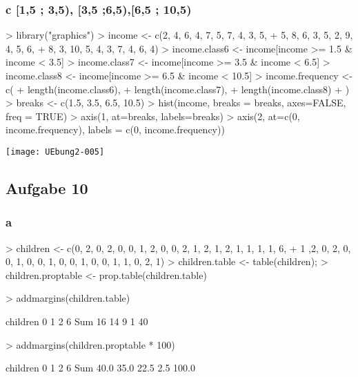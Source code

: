 \documentclass{article}
\begin{document}
\subsubsection{c [1,5 ; 3,5), [3,5 ;6,5),[6,5 ; 10,5)}

\begin{Schunk}
\begin{Sinput}
> library("graphics")
> income <- c(2, 4, 6, 4, 7, 5, 7, 4, 3, 5,
+             5, 8, 6, 3, 5, 2, 9, 4, 5, 6, 
+             8, 3, 10, 5, 4, 3, 7, 4, 6, 4)
> income.class6 <- income[income >= 1.5 & income < 3.5]
> income.class7 <- income[income >= 3.5 & income < 6.5]
> income.class8 <- income[income >= 6.5 & income < 10.5]
> income.frequency <- c(
+   length(income.class6),
+   length(income.class7),
+   length(income.class8)
+ )
> breaks <- c(1.5, 3.5, 6.5, 10.5)
> hist(income, breaks = breaks, axes=FALSE, freq = TRUE)
> axis(1, at=breaks, labels=breaks)
> axis(2, at=c(0, income.frequency), labels = c(0, income.frequency))
\end{Sinput}
\end{Schunk}
\texttt{[image: UEbung2-005]}

\subsection{Aufgabe 10}
\subsubsection{a}

\begin{Schunk}
\begin{Sinput}
> children <- c(0, 2, 0, 2, 0, 0, 1, 2, 0, 0, 2, 1, 2, 1, 2, 1, 1, 1, 1, 6, 
+               1 ,2, 0, 2, 0, 0, 1, 0, 0, 1, 0, 0, 1, 0, 0, 1, 1, 0, 2, 1)
> children.table <- table(children);
> children.proptable <- prop.table(children.table)
\end{Sinput}
\end{Schunk}

\begin{Schunk}
\begin{Sinput}
> addmargins(children.table)
\end{Sinput}
\begin{Soutput}
children
  0   1   2   6 Sum 
 16  14   9   1  40 
\end{Soutput}
\begin{Sinput}
> addmargins(children.proptable * 100)
\end{Sinput}
\begin{Soutput}
children
    0     1     2     6   Sum 
 40.0  35.0  22.5   2.5 100.0 
\end{Soutput}
\end{Schunk}
\end{document}
